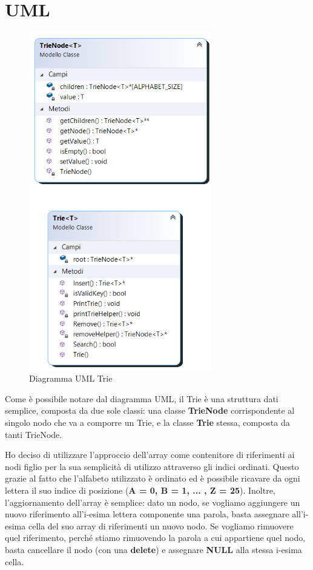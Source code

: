 \documentclass[a4paper, 12pt]{article}
\begin{document}
\clearpage

\section{UML}
\begin{figure}[ht!]
    \centering
    \includegraphics[width=8cm]{Images/ClassDiagram.png}
    \caption{Diagramma UML Trie}
    \label{fig:uml}
\end{figure}

\clearpage

Come è possibile notare dal diagramma UML, il Trie è una struttura dati semplice, composta da due sole classi: una classe \textbf{TrieNode} corrispondente al singolo nodo che va a comporre un Trie, e la classe \textbf{Trie} stessa, composta da tanti TrieNode.

Ho deciso di utilizzare l'approccio dell'array come contenitore di riferimenti ai nodi figlio per la sua semplicità di utilizzo attraverso gli indici ordinati. Questo grazie al fatto che l'alfabeto utilizzato è ordinato ed è possibile ricavare da ogni lettera il suo indice di posizione (\textbf{A = 0, B = 1, ... , Z = 25}). Inoltre, l'aggiornamento dell'array è semplice: dato un nodo, se vogliamo aggiungere un nuovo riferimento all'i-esima lettera componente una parola, basta assegnare all'i-esima cella del suo array di riferimenti un nuovo nodo. Se vogliamo rimuovere quel riferimento, perché stiamo rimuovendo la parola a cui appartiene quel nodo, basta cancellare il nodo (con una \textbf{delete}) e assegnare \textbf{NULL} alla stessa i-esima cella.
\end{document}
